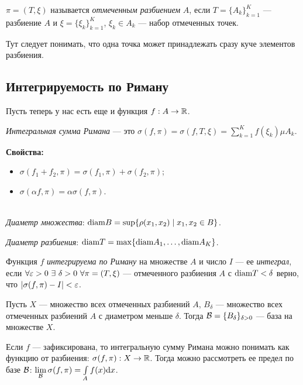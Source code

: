 \begin{Def}
$\pi = (T, \xi)$ называется \textit{отмеченным разбиением} $A$, если $T = \{ A_k \}^K_{k=1}$ --- разбиение $A$ и $\xi = \{\xi_k \}^K_{k=1}$, $\xi_k \in A_k$ --- набор отмеченных точек.
\end{Def}

Тут следует понимать, что одна точка может принадлежать сразу куче элементов разбиения.

\subsection{Интегрируемость по Риману}

Пусть теперь у нас есть еще и функция $f: A \to \mathbb{R}$.

\begin{Def}
\textit{Интегральная сумма Римана} --- это $\sigma(f, \pi) = \sigma(f, T, \xi) = \sum\limits^K_{k=1} f(\xi_k)\mu A_k$.
\end{Def}

\textbf{Свойства:}
\begin{itemize}
\item $\sigma(f_1 + f_2, \pi) = \sigma(f_1, \pi) + \sigma(f_2, \pi)$;
\item $\sigma(\alpha f, \pi) = \alpha \sigma(f, \pi)$.
\end{itemize}

\begin{Def}\ \\
\textit{Диаметр множества}: $\mathrm{diam} B = \sup \{ \rho(x_1, x_2) \mid x_1, x_2 \in B \}$.

\textit{Диаметр разбиения}: $\mathrm{diam} T = \max \{ \mathrm{diam} A_1, \ldots, \mathrm{diam} A_K \}$.
\end{Def}

\begin{Def}
Функция $f$ \textit{интегрируема по Риману} на множестве $A$ и число $I$ --- ее \textit{интеграл}, если
$\forall \varepsilon > 0\ \exists\ \delta > 0\ \forall \pi = (T, \xi)$ --- отмеченного разбиения $A$ с $\mathrm{diam} T < \delta $ верно, что $|\sigma(f, \pi) - I| < \varepsilon$. 
\end{Def}

Пусть $X$ --- множество всех отмеченных разбиений $A$, $B_\delta$ --- множество всех отмеченных разбиений $A$ с диаметром меньше $\delta$. Тогда $\mathcal{B} = \{ B_\delta \}_{\delta > 0}$ --- база на множестве $X$.

Если $f$ --- зафиксирована, то интегральную сумму Римана можно понимать как функцию от разбиения: $\sigma(f, \pi): X \to \mathbb{R}$. Тогда можно рассмотреть ее предел по базе $\mathcal{B}$: $\lim\limits_{\B}\sigma(f, \pi) \hm= \int\limits_{A} f(x) \d x$.

